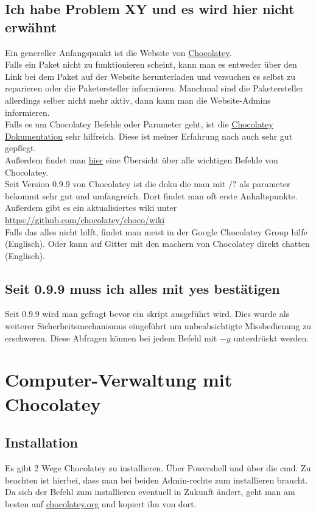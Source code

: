 \documentclass[10pt,a4paper]{article}
\begin{document}
\subsection{Ich habe Problem XY und es wird hier nicht erwähnt}
Ein genereller Anfangspunkt ist die Website von  \hyperlink{http://chocolatey.org/}{Chocolatey}.\\
Falls ein Paket nicht zu funktionieren scheint, kann man es entweder über den Link bei dem Paket auf der Website herunterladen und versuchen es selbst zu reparieren oder die Paketersteller informieren. Manchmal sind die Paketersteller allerdings selber nicht mehr aktiv, dann kann man die Website-Admins informieren.
\\
Falls es um Chocolatey Befehle oder Parameter geht, ist die \hyperlink{https://github.com/chocolatey/chocolatey/wiki}{Chocolatey Dokumentation} sehr hilfreich. Diese ist meiner Erfahrung nach auch sehr gut gepflegt.\\
Außerdem findet man \href{https://github.com/chocolatey/chocolatey/wiki/CommandsReference}{hier} eine Übersicht über alle wichtigen Befehle von Chocolatey.
\\
Seit Version 0.9.9 von Chocolatey ist die doku die man mit $/?$ als parameter bekommt sehr gut und umfangreich. Dort findet man oft erste Anhaltspunkte. Außerdem gibt es ein aktualisiertes wiki unter \url{https://github.com/chocolatey/choco/wiki}
\\
Falls das alles nicht hilft, findet man meist in der Google Chocolatey Group hilfe (Englisch). Oder kann auf Gitter mit den machern von Chocolatey direkt chatten (Englisch).

\subsection{Seit 0.9.9 muss ich alles mit yes bestätigen}
Seit 0.9.9 wird man gefragt bevor ein skript ausgeführt wird. Dies wurde als weiterer Sicherheitsmechanismus eingeführt um unbeabsichtigte Missbedienung zu erschweren. Diese Abfragen können bei jedem Befehl mit $-y$ unterdrückt werden.

\section{Computer-Verwaltung mit Chocolatey}

\subsection{Installation}
Es gibt 2 Wege Chocolatey zu installieren. Über Powershell und über die cmd. Zu beachten ist hierbei, dass man bei beiden Admin-rechte zum installieren braucht. Da sich der Befehl zum installieren eventuell in Zukunft ändert, geht man am besten auf \href{http://chocolatey.org}{chocolatey.org} und kopiert ihn von dort.
\end{document}
